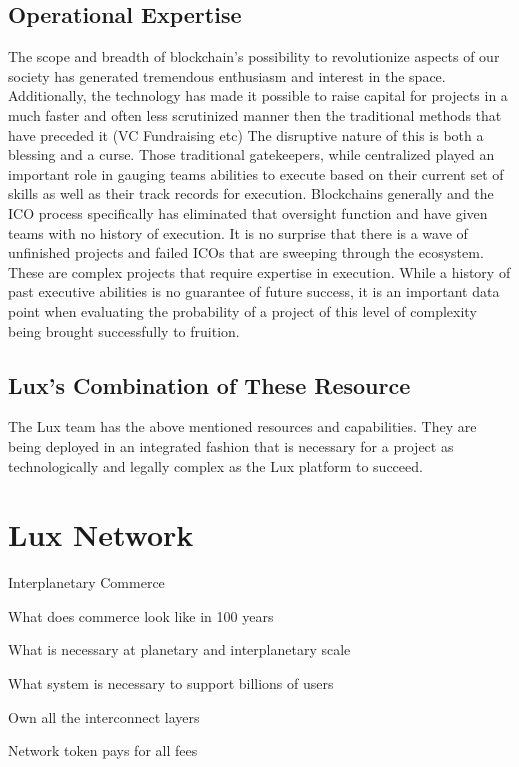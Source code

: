 \documentclass[11pt]{article}
\begin{document}
\subsection{Operational Expertise}

The scope and breadth of blockchain's possibility to revolutionize aspects of our society has generated tremendous enthusiasm and interest in the space. Additionally, the technology has made it possible to raise capital for projects in a much faster and often less scrutinized manner then the traditional methods that have preceded it (VC Fundraising etc) The disruptive nature of this is both a blessing and a curse. Those traditional gatekeepers, while centralized played an important role in gauging teams abilities to execute based on their current set of skills as well as their track records for execution. Blockchains generally and the ICO process specifically has eliminated that oversight function and have given teams with no history of execution. It is no surprise that there is a wave of unfinished projects and failed ICOs that are sweeping through the ecosystem. These are complex projects that require expertise in execution. While a history of past executive abilities is no guarantee of future success, it is an important data point when evaluating the probability of a project of this level of complexity being brought successfully to fruition.


\subsection{Lux's Combination of These Resource}

The Lux team has the above mentioned resources and capabilities. They are being deployed in an integrated fashion that is necessary for a project as technologically and legally complex as the Lux platform to succeed.


\section{Lux Network}

Interplanetary Commerce


What does commerce look like in 100 years


What is necessary at planetary and interplanetary scale


What system is necessary to support billions of users


Own all the interconnect layers


Network token pays for all fees
\end{document}
